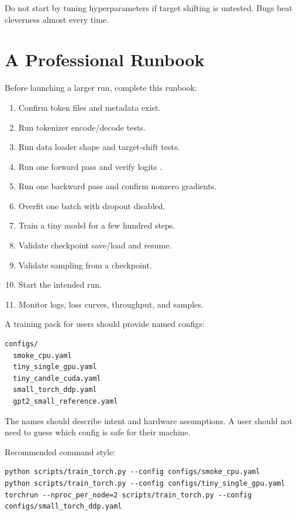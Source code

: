 Do not start by tuning hyperparameters if target shifting is untested. Bugs beat cleverness almost every time.

\section{A Professional Runbook}

Before launching a larger run, complete this runbook:

\begin{enumerate}
  \item Confirm token files and metadata exist.
  \item Run tokenizer encode/decode tests.
  \item Run data loader shape and target-shift tests.
  \item Run one forward pass and verify logits \shape{[B,T,V]}.
  \item Run one backward pass and confirm nonzero gradients.
  \item Overfit one batch with dropout disabled.
  \item Train a tiny model for a few hundred steps.
  \item Validate checkpoint save/load and resume.
  \item Validate sampling from a checkpoint.
  \item Start the intended run.
  \item Monitor logs, loss curves, throughput, and samples.
\end{enumerate}

\engineering

A training pack for users should provide named configs:

\begin{lstlisting}
configs/
  smoke_cpu.yaml
  tiny_single_gpu.yaml
  tiny_candle_cuda.yaml
  small_torch_ddp.yaml
  gpt2_small_reference.yaml
\end{lstlisting}

The names should describe intent and hardware assumptions. A user should not need to guess which config is safe for their machine.

Recommended command style:

\begin{lstlisting}
python scripts/train_torch.py --config configs/smoke_cpu.yaml
python scripts/train_torch.py --config configs/tiny_single_gpu.yaml
torchrun --nproc_per_node=2 scripts/train_torch.py --config configs/small_torch_ddp.yaml
\end{lstlisting}

